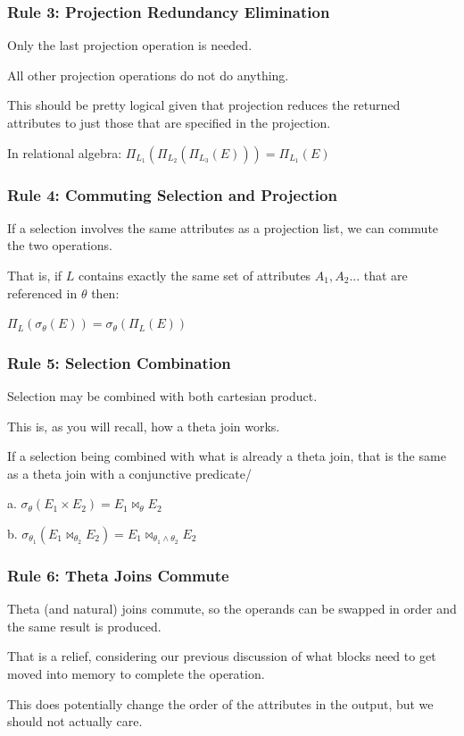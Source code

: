 \begin{frame}
\frametitle{Rule 3: Projection Redundancy Elimination}

Only the last projection operation is needed. 

All other projection operations do not do anything. 

This should be pretty logical given that projection reduces the returned attributes to just those that are specified in the projection.

In relational algebra: $\Pi_{L_{1}}(\Pi_{L_{2}}(\Pi_{L_{3}}(E))) = \Pi_{L_{1}}(E)$

\end{frame}


\begin{frame}
\frametitle{Rule 4: Commuting Selection and Projection}

If a selection involves the same attributes as a projection list, we can commute the two operations. 

That is, if $L$ contains exactly the same set of attributes $A_{1}, A_{2}...$ that are referenced in $\theta$ then:

$\Pi_{L}(\sigma_{\theta}(E)) = \sigma_{\theta}(\Pi_{L}(E))$



\end{frame}

\begin{frame}
\frametitle{Rule 5: Selection Combination}

Selection may be combined with both cartesian product. 

This is, as you will recall, how a theta join works.

If a selection being combined with what is already a theta join, that is the same as a theta join with a conjunctive predicate/

a. $\sigma_{\theta}(E_{1} \times E_{2}) = E_{1} \bowtie_{\theta} E_{2}$

b. $\sigma_{\theta_{1}}( E_{1} \bowtie_{\theta_{2}} E_{2}) = E_{1} \bowtie_{\theta_{1}\wedge\theta_{2}} E_{2}$

\end{frame}

\begin{frame}
\frametitle{Rule 6: Theta Joins Commute}

Theta (and natural) joins commute, so the operands can be swapped in order and the same result is produced. 

That is a relief, considering our previous discussion of what blocks need to get moved into memory to complete the operation. 

This does potentially change the order of the attributes in the output, but we should not actually care.

\end{frame}


